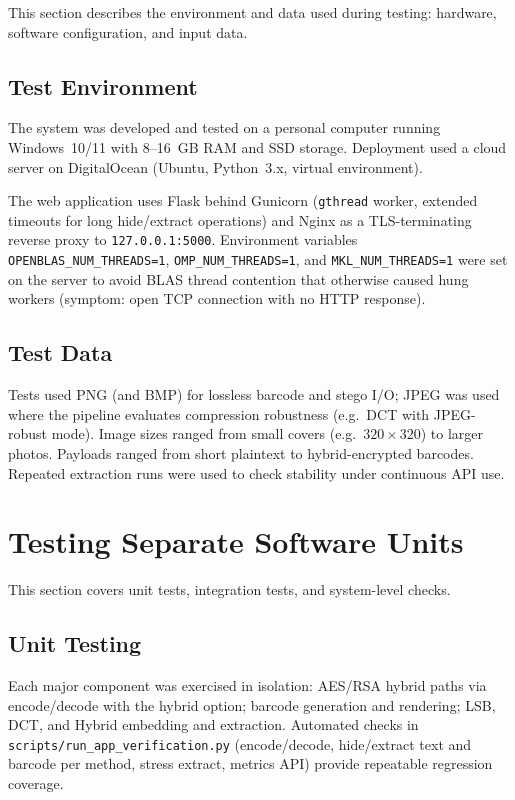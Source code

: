 This section describes the environment and data used during testing: hardware, software configuration, and input data.

\subsection{Test Environment}

The system was developed and tested on a personal computer running Windows~10/11 with 8--16~GB RAM and SSD storage. Deployment used a cloud server on DigitalOcean (Ubuntu, Python~3.x, virtual environment).

The web application uses Flask behind Gunicorn (\texttt{gthread} worker, extended timeouts for long hide/extract operations) and Nginx as a TLS-terminating reverse proxy to \texttt{127.0.0.1:5000}. Environment variables \texttt{OPENBLAS\_NUM\_THREADS=1}, \texttt{OMP\_NUM\_THREADS=1}, and \texttt{MKL\_NUM\_THREADS=1} were set on the server to avoid BLAS thread contention that otherwise caused hung workers (symptom: open TCP connection with no HTTP response).

\subsection{Test Data}

Tests used PNG (and BMP) for lossless barcode and stego I/O; JPEG was used where the pipeline evaluates compression robustness (e.g.\ DCT with JPEG-robust mode). Image sizes ranged from small covers (e.g.\ $320 \times 320$) to larger photos. Payloads ranged from short plaintext to hybrid-encrypted barcodes. Repeated extraction runs were used to check stability under continuous API use.

\section{Testing Separate Software Units}

This section covers unit tests, integration tests, and system-level checks.

\subsection{Unit Testing}

Each major component was exercised in isolation: AES/RSA hybrid paths via encode/decode with the hybrid option; barcode generation and rendering; LSB, DCT, and Hybrid embedding and extraction. Automated checks in \texttt{scripts/run\_app\_verification.py} (encode/decode, hide/extract text and barcode per method, stress extract, metrics API) provide repeatable regression coverage.

